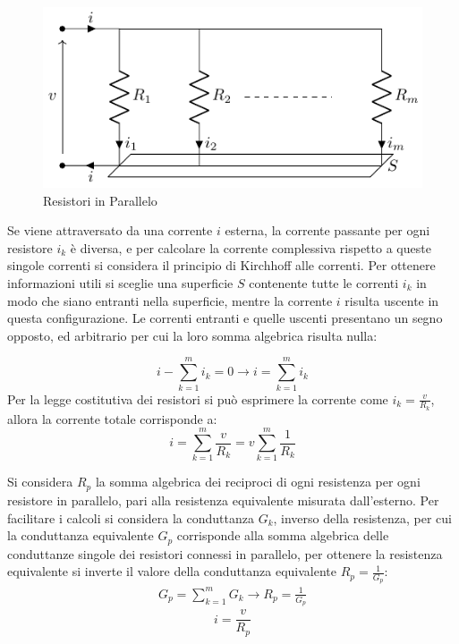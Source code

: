 \documentclass{article}
\numberwithin{equation}{subsection}
\begin{document}
\begin{figure}[H]%
    \centering
    \includegraphics{resistori-parallelo.pdf}%
    \caption{Resistori in Parallelo}
    \label{fig:resistori-parallelo}
\end{figure}

Se viene attraversato da una corrente $i$ esterna, la corrente passante per ogni resistore $i_k$ è diversa, e per calcolare la corrente complessiva rispetto a queste singole 
correnti si considera il principio di Kirchhoff alle correnti. Per ottenere informazioni utili si sceglie una superficie $S$ contenente tutte le correnti $i_k$ in modo che 
siano entranti nella superficie, mentre la corrente $i$ risulta uscente in questa configurazione. Le correnti entranti e quelle uscenti presentano un segno opposto, ed 
arbitrario per cui la loro somma algebrica risulta nulla:

\begin{equation*}
    i-\displaystyle\sum_{k=1}^mi_k=0\to i=\sum_{k=1}^mi_k
\end{equation*}
Per la legge costitutiva dei resistori si può esprimere la corrente come $i_k=\displaystyle\frac{v}{R_k}$, allora la corrente totale corrisponde a: 
\begin{equation*}
    i=\displaystyle\sum_{k=1}^m\frac{v}{R_k}=v\sum_{k=1}^m\frac{1}{R_k}
\end{equation*}

Si considera $R_p$ la somma algebrica dei reciproci di ogni resistenza per ogni resistore in parallelo, pari alla resistenza equivalente misurata dall'esterno. Per 
facilitare i calcoli si considera la conduttanza $G_k$, inverso della resistenza, per cui la conduttanza equivalente $G_p$ corrisponde alla somma algebrica delle conduttanze 
singole dei resistori connessi in parallelo, per ottenere la resistenza equivalente si inverte il valore della conduttanza equivalente $\displaystyle R_p=\frac{1}{G_p}$: 
\begin{gather*}
    G_p=\displaystyle\sum_{k=1}^mG_k\to R_p=\displaystyle\frac{1}{G_p}
\end{gather*} 
\begin{equation}
    i=\displaystyle\frac{v}{R_p}
\end{equation}
\end{document}
